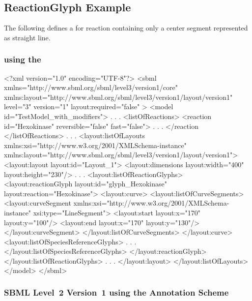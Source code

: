 \subsection{ReactionGlyph Example}
The following defines a \ReactionGlyph for reaction  
containing only a center segment represented as straight line. 

\label{example:reactionglyph}
\subsubsection{\sbmlthreecore using the \LayoutPackage}
\begin{example}
<?xml version="1.0" encoding="UTF-8"?>
<sbml xmlns="http://www.sbml.org/sbml/level3/version1/core" 
		xmlns:layout="http://www.sbml.org/sbml/level3/version1/layout/version1" 
		level="3" version="1" layout:required="false" >		
  <model id="TestModel_with_modifiers">
                .
                .
                .
    <listOfReactions>
      <reaction id="Hexokinase" reversible="false" fast="false">
                .
                .
                .
      </reaction
    </listOfReactions>
                .
                .
                .
     <layout:listOfLayouts xmlns:xsi="http://www.w3.org/2001/XMLSchema-instance" 
		xmlns:layout="http://www.sbml.org/sbml/level3/version1/layout/version1">
      <layout:layout layout:id="Layout_1">
        <layout:dimensions layout:width="400" layout:height="230"/>
                .
                .
                .
        <layout:listOfReactionGlyphs>
          <layout:reactionGlyph layout:id="glyph_Hexokinase" layout:reaction="Hexokinase">
            <layout:curve>
              <layout:listOfCurveSegments>
                <layout:curveSegment 
					xmlns:xsi="http://www.w3.org/2001/XMLSchema-instance" 
					xsi:type="LineSegment">
                  <layout:start layout:x="170" layout:y="100"/>
                  <layout:end layout:x="170" layout:y="130"/>
                </layout:curveSegment>
              </layout:listOfCurveSegments>
            </layout:curve>
            <layout:listOfSpeciesReferenceGlyphs>
                .
                .
                .
            </layout:listOfSpeciesReferenceGlyphs>
          </layout:reactionGlyph>
        </layout:listOfReactionGlyphs>
                .
                .
                .
			</layout:layout>
		</layout:listOfLayouts>
  </model>
</sbml>
\end{example}
\subsubsection{SBML Level~2 Version~1 using the Annotation Scheme}

